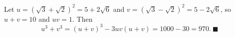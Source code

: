 Let $u=(\sqrt3+\sqrt2)^2=5+2\sqrt6$ and $v=(\sqrt3-\sqrt2)^2=5-2\sqrt6$, so $u+v=10$ and $uv=1$. Then
\[u^3+v^3=(u+v)^3-3uv(u+v)=1000-30=970.\ \blacksquare\]
